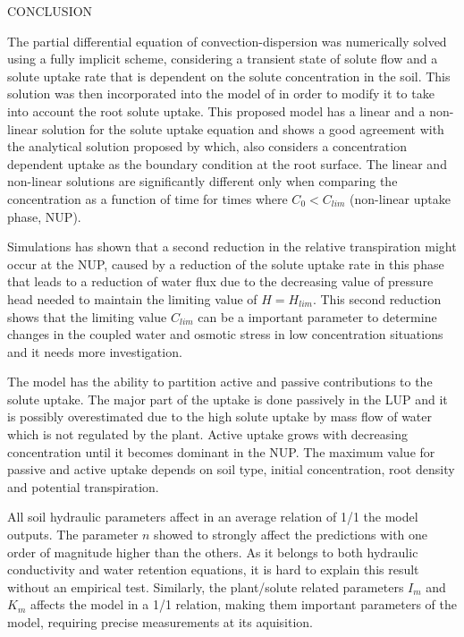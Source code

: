 \cleardoublepage
\chap CONCLUSION

The partial differential equation of convection-dispersion was numerically solved using a fully implicit scheme, considering a transient state of solute flow and a solute uptake rate that is dependent on the solute concentration in the soil.
This solution was then incorporated into the model of \citeonline[liersolute] in order to modify it to take into account the root solute uptake.
This proposed model has a linear and a non-linear solution for the solute uptake equation and shows a good agreement with the analytical solution proposed by \citeonline[cushman] which, also considers a concentration dependent uptake as the boundary condition at the root surface.
The linear and non-linear solutions are significantly different only when comparing the concentration as a function of time for times where $C_0 < C_{lim}$ (non-linear uptake phase, NUP).

Simulations has shown that a second reduction in the relative transpiration might occur at the NUP, caused by a reduction of the solute uptake rate in this phase that leads to a reduction of water flux due to the decreasing value of pressure head needed to maintain the limiting value of $H=H_{lim}$.
This second reduction shows that the limiting value $C_{lim}$ can be a important parameter to determine changes in the coupled water and osmotic stress in low concentration situations and it needs more investigation.

The model has the ability to partition active and passive contributions to the solute uptake.
The major part of the uptake is done passively  in the LUP and it is possibly overestimated due to the high solute uptake by mass flow of water which is not regulated by the plant. 
Active uptake grows with decreasing concentration until it becomes dominant in the NUP.
The maximum value for passive and active uptake depends on soil type, initial concentration, root density and potential transpiration.

All soil hydraulic parameters affect in an average relation of 1/1 the model outputs.
The parameter $n$ showed to strongly affect the predictions with one order of magnitude higher than the others.
As it belongs to both hydraulic conductivity and water retention equations, it is hard to explain this result without an empirical test.
Similarly, the plant/solute related parameters $I_m$ and $K_m$ affects the model in a 1/1 relation, making them important parameters of the model, requiring precise measurements at its aquisition.

